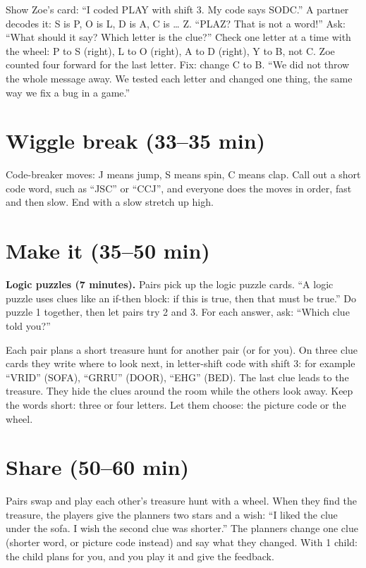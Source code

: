 \begin{bughunt}
Show Zoe's card: \enquote{I coded PLAY with shift 3. My code says SODC.} A partner decodes it: S is P, O is L, D is A, C is \ldots{} Z. \enquote{PLAZ? That is not a word!} Ask: \enquote{What should it say? Which letter is the clue?} Check one letter at a time with the wheel: P to S (right), L to O (right), A to D (right), Y to B, not C. Zoe counted four forward for the last letter. Fix: change C to B. \enquote{We did not throw the whole message away. We tested each letter and changed one thing, the same way we fix a bug in a game.}
\end{bughunt}

\section{Wiggle break (33--35 min)}
Code-breaker moves: J means jump, S means spin, C means clap. Call out a short code word, such as \enquote{JSC} or \enquote{CCJ}, and everyone does the moves in order, fast and then slow. End with a slow stretch up high.

\section{Make it (35--50 min)}
\textbf{Logic puzzles (7 minutes).} Pairs pick up the logic puzzle cards. \enquote{A logic puzzle uses clues like an if-then block: if this is true, then that must be true.} Do puzzle 1 together, then let pairs try 2 and 3. For each answer, ask: \enquote{Which clue told you?}

\begin{freebuild}
Each pair plans a short treasure hunt for another pair (or for you). On three clue cards they write where to look next, in letter-shift code with shift 3: for example \enquote{VRID} (SOFA), \enquote{GRRU} (DOOR), \enquote{EHG} (BED). The last clue leads to the treasure. They hide the clues around the room while the others look away. Keep the words short: three or four letters. Let them choose: the picture code or the wheel.
\end{freebuild}

\section{Share (50--60 min)}
\begin{teacherscript}
Pairs swap and play each other's treasure hunt with a wheel. When they find the treasure, the players give the planners two stars and a wish: \enquote{I liked the clue under the sofa. I wish the second clue was shorter.} The planners change one clue (shorter word, or picture code instead) and say what they changed. With 1 child: the child plans for you, and you play it and give the feedback.
\end{teacherscript}

